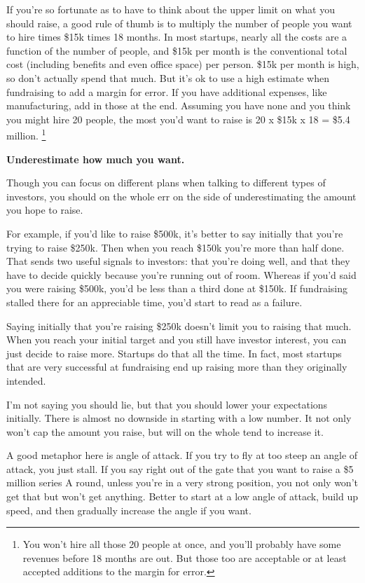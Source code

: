 If you're so fortunate as to have to think about the upper limit on what
you should raise, a good rule of thumb is to multiply the number of
people you want to hire times \$15k times 18 months. In most startups,
nearly all the costs are a function of the number of people, and \$15k
per month is the conventional total cost (including benefits and even
office space) per person. \$15k per month is high, so don't actually
spend that much. But it's ok to use a high estimate when fundraising to
add a margin for error. If you have additional expenses, like
manufacturing, add in those at the end. Assuming you have none and you
think you might hire 20 people, the most you'd want to raise is 20 x
\$15k x 18 = \$5.4 million. \footnote{You won't hire all those 20 people at once, and you'll probably
have some revenues before 18 months are out. But those too are
acceptable or at least accepted additions to the margin for error.}

\textbf{Underestimate how much you want.}

Though you can focus on different plans when talking to different types
of investors, you should on the whole err on the side of underestimating
the amount you hope to raise.

For example, if you'd like to raise \$500k, it's better to say initially
that you're trying to raise \$250k. Then when you reach \$150k you're
more than half done. That sends two useful signals to investors: that
you're doing well, and that they have to decide quickly because you're
running out of room. Whereas if you'd said you were raising \$500k,
you'd be less than a third done at \$150k. If fundraising stalled there
for an appreciable time, you'd start to read as a failure.

Saying initially that you're raising \$250k doesn't limit you to raising
that much. When you reach your initial target and you still have
investor interest, you can just decide to raise more. Startups do that
all the time. In fact, most startups that are very successful at
fundraising end up raising more than they originally intended.

I'm not saying you should lie, but that you should lower your
expectations initially. There is almost no downside in starting with a
low number. It not only won't cap the amount you raise, but will on the
whole tend to increase it.

A good metaphor here is angle of attack. If you try to fly at too steep
an angle of attack, you just stall. If you say right out of the gate
that you want to raise a \$5 million series A round, unless you're in a
very strong position, you not only won't get that but won't get
anything. Better to start at a low angle of attack, build up speed, and
then gradually increase the angle if you want.

